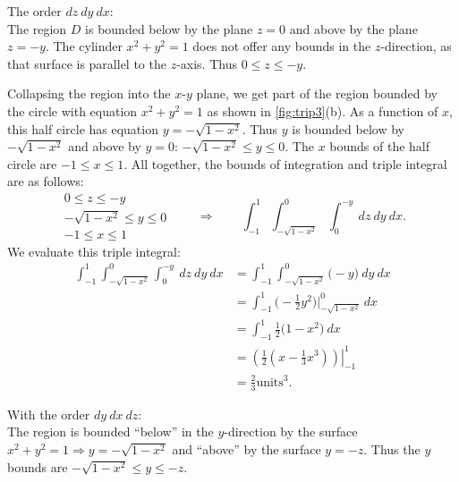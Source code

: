 {The order $dz\ dy\ dx$:\\

The region $D$ is bounded below by the plane $z=0$ and above by the plane $z=-y$. The cylinder $x^2+y^2=1$ does not offer any bounds in the $z$-direction, as that surface is parallel to the $z$-axis. Thus $0\leq z\leq -y$.

Collapsing the region into the $x$-$y$ plane, we get part of the region bounded by the circle with equation $x^2+y^2=1$ as shown in \autoref{fig:trip3}(b). As a function of $x$, this half circle has equation $y=-\sqrt{1-x^2}$. Thus $y$ is bounded below by $-\sqrt{1-x^2}$ and above by $y=0$: $-\sqrt{1-x^2}\leq y\leq 0$. The $x$ bounds of the half circle are $-1\leq x\leq 1$. All together, the bounds of integration and triple integral are  as follows:
\[
 \begin{gathered}
  0\leq z\leq -y\\
  -\sqrt{1-x^2}\leq y\leq 0\\
  -1\leq x\leq 1
 \end{gathered}
 \qquad\Rightarrow\qquad
 \int_{-1}^1\int_{-\sqrt{1-x^2}}^{0}\int_0^{-y}\ dz\ dy\ dx.
\]
We evaluate this triple integral:
\begin{align*}
	\int_{-1}^1\int_{-\sqrt{1-x^2}}^{0}\int_0^{-y}\ dz\ dy\ dx
	&= \int_{-1}^1\int_{-\sqrt{1-x^2}}^{0}\big(-y\big)\ dy\ dx\\
	&=\int_{-1}^1\big(-\frac12y^2\big)\Big|_{-\sqrt{1-x^2}}^{0}\ dx\\
	&= \int_{-1}^1 \frac12\big(1-x^2\big)\ dx\\
	&= \left.\left(\frac12\left(x-\frac13x^3\right)\right)\right|_{-1}^1\\
	&= \frac23\text{units}^3.
\end{align*}

\noindent With the order $dy\ dx\ dz$:\\

The region is bounded ``below'' in the $y$-direction by the surface $x^2+y^2=1 \Rightarrow y=-\sqrt{1-x^2}$ and ``above'' by the surface $y=-z$. Thus the $y$ bounds are $-\sqrt{1-x^2}\leq y\leq -z$.


}
